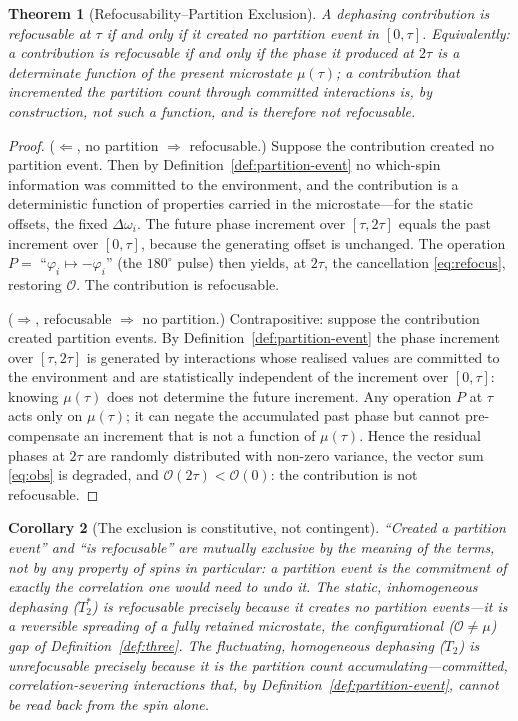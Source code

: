 \documentclass[11pt,a4paper]{article}
\theoremstyle{thmstyle}
\newtheorem{theorem}{Theorem}[section]
\newtheorem{corollary}[theorem]{Corollary}
\theoremstyle{definition}
\theoremstyle{remark}
\newcommand{\Tprep}{T_{2}^{*}}
\newcommand{\Ttwo}{T_{2}}
\newcommand{\Obs}{\mathcal{O}}
\newcommand{\Mic}{\mu}
\begin{document}
\begin{theorem}[Refocusability--Partition Exclusion]
\label{thm:exclusion}
A dephasing contribution is refocusable at $\tau$ \emph{if and only if}
it created no partition event in $[0,\tau]$. Equivalently: a contribution
is refocusable if and only if the phase it produced at $2\tau$ is a
determinate function of the present microstate $\Mic(\tau)$; a
contribution that incremented the partition count through committed
interactions is, by construction, not such a function, and is therefore
not refocusable.
\end{theorem}

\begin{proof}
($\Leftarrow$, no partition $\Rightarrow$ refocusable.) Suppose the
contribution created no partition event. Then by
Definition~\ref{def:partition-event} no which-spin information was
committed to the environment, and the contribution is a deterministic
function of properties carried in the microstate---for the static
offsets, the fixed $\Delta\omega_{i}$. The future phase increment over
$[\tau,2\tau]$ equals the past increment over $[0,\tau]$, because the
generating offset is unchanged. The operation $P=$ ``$\varphi_{i}\mapsto
-\varphi_{i}$'' (the $180^{\circ}$ pulse) then yields, at $2\tau$, the
cancellation \eqref{eq:refocus}, restoring $\Obs$. The contribution is
refocusable.

($\Rightarrow$, refocusable $\Rightarrow$ no partition.) Contrapositive:
suppose the contribution created partition events. By
Definition~\ref{def:partition-event} the phase increment over
$[\tau,2\tau]$ is generated by interactions whose realised values are
committed to the environment and are statistically independent of the
increment over $[0,\tau]$: knowing $\Mic(\tau)$ does not determine the
future increment. Any operation $P$ at $\tau$ acts only on $\Mic(\tau)$;
it can negate the accumulated past phase but cannot pre-compensate an
increment that is not a function of $\Mic(\tau)$. Hence the residual
phases at $2\tau$ are randomly distributed with non-zero variance, the
vector sum \eqref{eq:obs} is degraded, and $\Obs(2\tau)<\Obs(0)$: the
contribution is not refocusable.
\end{proof}

\begin{corollary}[The exclusion is constitutive, not contingent]
\label{cor:constitutive}
``Created a partition event'' and ``is refocusable'' are mutually
exclusive by the meaning of the terms, not by any property of spins in
particular: a partition event \emph{is} the commitment of exactly the
correlation one would need to undo it. The static, inhomogeneous
dephasing ($\Tprep$) is refocusable precisely because it creates no
partition events---it is a reversible spreading of a fully retained
microstate, the configurational ($\Obs\neq\Mic$) gap of
Definition~\ref{def:three}. The fluctuating, homogeneous dephasing
($\Ttwo$) is unrefocusable precisely because it is the partition count
accumulating---committed, correlation-severing interactions that, by
Definition~\ref{def:partition-event}, cannot be read back from the spin
alone.
\end{corollary}
\end{document}
